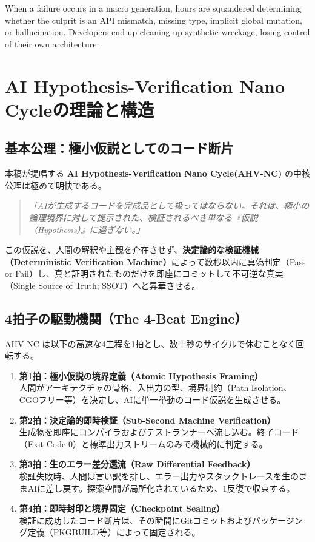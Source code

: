 \documentclass[11pt,a4paper,openany]{book}
\newif\ifja
\begin{document}
  When a failure occurs in a macro generation, hours are squandered determining whether the culprit is an API mismatch, missing type, implicit global mutation, or hallucination. Developers end up cleaning up synthetic wreckage, losing control of their own architecture.
\fi

\ifja
  \chapter{AI Hypothesis-Verification Nano Cycle\texttrademark の理論と構造}
  \section{基本公理：極小仮説としてのコード断片}
  本稿が提唱する \textbf{AI Hypothesis-Verification Nano Cycle\texttrademark (AHV-NC)} の中核公理は極めて明快である。

  \begin{quote}
  \textit{「AIが生成するコードを完成品として扱ってはならない。それは、極小の論理境界に対して提示された、検証されるべき単なる『仮説（Hypothesis）』に過ぎない。」}
  \end{quote}

  この仮説を、人間の解釈や主観を介在させず、\textbf{決定論的な検証機械（Deterministic Verification Machine）}によって数秒以内に真偽判定（Pass or Fail）し、真と証明されたものだけを即座にコミットして不可逆な真実（Single Source of Truth; SSOT）へと昇華させる。

  \section{4拍子の駆動機関（The 4-Beat Engine）}
  AHV-NC は以下の高速な4工程を1拍とし、数十秒のサイクルで休むことなく回転する。

  \begin{enumerate}
    \item \textbf{第1拍：極小仮説の境界定義（Atomic Hypothesis Framing）}\\
      人間がアーキテクチャの骨格、入出力の型、境界制約（Path Isolation、CGOフリー等）を決定し、AIに単一挙動のコード仮説を生成させる。
    \item \textbf{第2拍：決定論的即時検証（Sub-Second Machine Verification）}\\
      生成物を即座にコンパイラおよびテストランナーへ流し込む。終了コード（Exit Code 0）と標準出力ストリームのみで機械的に判定する。
    \item \textbf{第3拍：生のエラー差分還流（Raw Differential Feedback）}\\
      検証失敗時、人間は言い訳を排し、エラー出力やスタックトレースを生のままAIに差し戻す。探索空間が局所化されているため、1反復で収束する。
    \item \textbf{第4拍：即時封印と境界固定（Checkpoint Sealing）}\\
      検証に成功したコード断片は、その瞬間にGitコミットおよびパッケージング定義（PKGBUILD等）によって固定される。
  \end{enumerate}
\else
\end{document}
